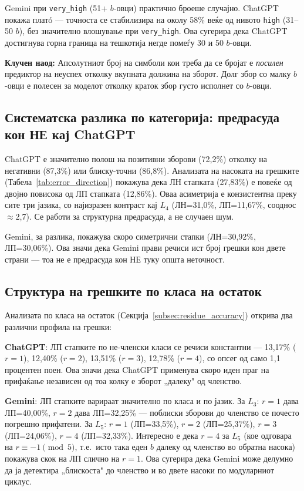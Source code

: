 \documentclass[12pt,a4paper]{article}
\theoremstyle{definition}
\begin{document}
Gemini при \texttt{very\_high} (51+ $b$-овци) практично броеше случајно. ChatGPT покажа платó --- точноста се стабилизира на околу 58\% веќе од нивото \texttt{high} (31--50 $b$), без значително влошување при \texttt{very\_high}. Ова сугерира дека ChatGPT достигнува горна граница на тешкотија негде помеѓу 30 и 50 $b$-овци.

\textbf{Клучен наод:} Апсолутниот број на симболи кои треба да се бројат е \textit{посилен} предиктор на неуспех отколку вкупната должина на зборот. Долг збор со малку $b$-овци е полесен за моделот отколку краток збор густо исполнет со $b$-овци.

\subsection{Систематска разлика по категорија: предрасуда кон НЕ кај ChatGPT}

ChatGPT е значително полош на позитивни зборови (72,2\%) отколку на негативни (87,3\%) или блиску-точни (86,8\%). Анализата на насоката на грешките (Табела~\ref{tab:error_direction}) покажува дека ЛН стапката (27,83\%) е повеќе од двојно повисока од ЛП стапката (12,86\%). Оваа асиметрија е конзистентна преку сите три јазика, со најизразен контраст кај $L_4$ (ЛН=31,0\%, ЛП=11,67\%, сооднос $\approx$2,7). Се работи за структурна предрасуда, а не случаен шум.

Gemini, за разлика, покажува скоро симетрични стапки (ЛН=30,92\%, ЛП=30,06\%). Ова значи дека Gemini прави речиси ист број грешки кон двете страни --- тоа не е предрасуда кон НЕ туку општа неточност.

\subsection{Структура на грешките по класа на остаток}

Анализата по класа на остаток (Секција~\ref{subsec:residue_accuracy}) открива два различни профила на грешки:

\textbf{ChatGPT}: ЛП стапките по не-членски класи се речиси константни --- 13,17\% ($r=1$), 12,40\% ($r=2$), 13,51\% ($r=3$), 12,78\% ($r=4$), со опсег од само 1,1 процентен поен. Ова значи дека ChatGPT применува скоро иден праг на прифаќање независен од тоа колку е зборот „далеку" од членство.

\textbf{Gemini}: ЛП стапките варираат значително по класа и по јазик. За $L_3$: $r=1$ дава ЛП=40,00\%, $r=2$ дава ЛП=32,25\% --- поблиски зборови до членство се почесто погрешно прифатени. За $L_5$: $r=1$ (ЛП=33,5\%), $r=2$ (ЛП=25,37\%), $r=3$ (ЛП=24,06\%), $r=4$ (ЛП=32,33\%). Интересно е дека $r=4$ за $L_5$ (кое одговара на $r \equiv -1 \pmod 5$, т.е.\ исто така еден $b$ далеку од членство во обратна насока) покажува скок на ЛП слично на $r=1$. Ова сугерира дека Gemini може делумно да ја детектира „блискоста" до членство и во двете насоки по модуларниот циклус.
\end{document}
